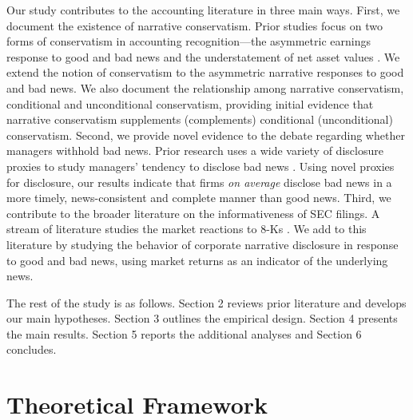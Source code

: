 \documentclass[letterpaper,12pt]{article}
\begin{document}
\begin{spacing}{1.5}
Our study contributes to the accounting literature in three main ways. First, we document the existence of narrative conservatism. Prior studies focus on two forms of conservatism in accounting recognition---the asymmetric earnings response to good and bad news and the understatement of net asset values \cite{basuConservatismPrincipleAsymmetric1997, ballEarningsQualityUK2005, beaverConditionalUnconditionalConservatism2005}. We extend the notion of conservatism to the asymmetric narrative responses to good and bad news. We also document the relationship among narrative conservatism, conditional and unconditional conservatism, providing initial evidence that narrative conservatism supplements (complements) conditional (unconditional) conservatism.
Second, we provide novel evidence to the debate regarding whether managers withhold bad news. Prior research uses a wide variety of disclosure proxies to study managers' tendency to disclose bad news \cite{kasznikWarnNotWarn1995, kothariManagersWithholdBad2009, baoManagersDiscloseWithhold2019}. Using novel proxies for disclosure, our results indicate that firms \textit{on average} disclose bad news in a more timely, news-consistent and complete manner than good news. Third, we contribute to the broader literature on the informativeness of SEC filings. A stream of literature studies the market reactions to 8-Ks \cite{carterRelevanceForm8K1999, pinskerHasFirmsForm2006, lermanNewForm8K2010}. We add to this literature by studying the behavior of corporate narrative disclosure in response to good and bad news, using market returns as an indicator of the underlying news.

The rest of the study is as follows. Section 2 reviews prior literature and develops our main hypotheses. Section 3 outlines the empirical design. Section 4 presents the main results. Section 5 reports the additional analyses and Section 6 concludes.

\section{Theoretical Framework}

\end{spacing}
\end{document}
